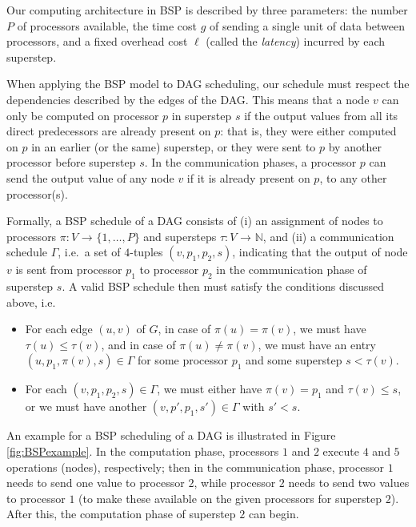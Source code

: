 \documentclass[sigconf,nonacm]{acmart}
\begin{document}
Our computing architecture in BSP is described by three parameters: the number $P$ of processors available, the time cost $g$ of sending a single unit of data between processors, and a fixed overhead cost $\ell$ (called the \emph{latency}) incurred by each superstep.

When applying the BSP model to DAG scheduling, our schedule must respect the dependencies described by the edges of the DAG. This means that a node $v$ can only be computed on processor $p$ in superstep $s$ if the output values from all its direct predecessors are already present on $p$: that is, they were either computed on $p$ in an earlier (or the same) superstep, or they were sent to $p$ by another processor before superstep $s$. In the communication phases, a processor $p$ can send the output value of any node $v$ if it is already present on $p$, to any other processor(s).

Formally, a BSP schedule of a DAG consists of (i) an assignment of nodes to processors $\pi :V_{\!} \rightarrow_{\!} \{1, \dots, P \}$ and supersteps $\tau :V _{\!}\rightarrow _{\!} \mathbb{N}$, and (ii) a communication schedule $\Gamma$, i.e.\ a set of $4$-tuples $(v, p_1, p_2, s)$, indicating that the output of node $v$ is sent from processor $p_1$ to processor $p_2$ in the communication phase of superstep $s$. A valid BSP schedule then must satisfy the conditions discussed above, i.e.\:
\begin{itemize}[topsep=4pt,itemsep=0pt,partopsep=2pt,parsep=6pt]
 \item For each edge $(u,v)$ of $G$, in case of $\pi(u)=\pi(v)$, we must have $\tau(u) \leq \tau(v)$, and in case of $\pi(u) \neq \pi(v)$, we must have an entry $(u, p_1, \pi(v), s) \in \Gamma$ for some processor $p_1$ and some superstep $s < \tau(v)$.
 \item For each $(v, p_1, p_2, s) \in \Gamma$, we must either have $\pi(v)=p_1$ and $\tau(v) \leq s$, or we must have another $(v, p', p_1, s') \in \Gamma$ with $s'<s$.
\end{itemize}

An example for a BSP scheduling of a DAG is illustrated in Figure \ref{fig:BSPexample}. In the computation phase, processors $1$ and $2$ execute $4$ and $5$ operations (nodes), respectively; then in the communication phase, processor $1$ needs to send one value to processor $2$, while processor $2$ needs to send two values to processor $1$ (to make these available on the given processors for superstep $2$). After this, the computation phase of superstep $2$ can begin.
\end{document}
